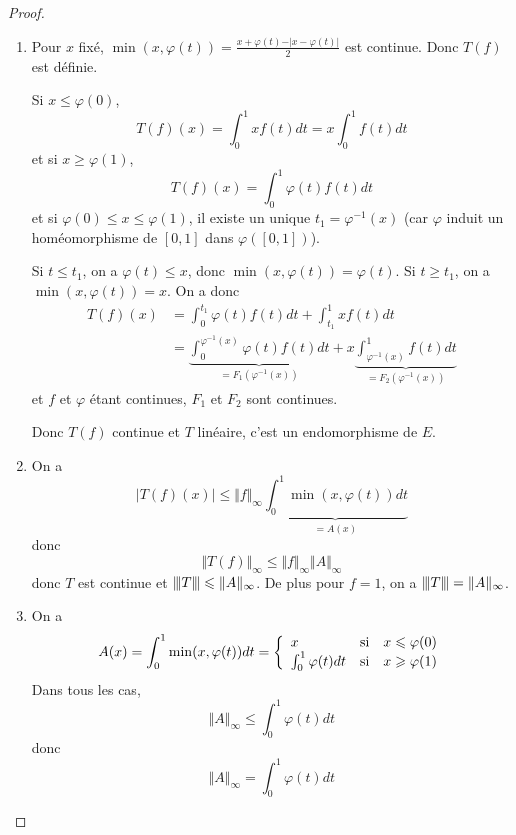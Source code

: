 \begin{proof}
	\phantom{}
	\begin{enumerate}
		\item Pour $x$ fixé, $\min(x,\varphi(t))=\frac{x+\varphi(t)-\vert x-\varphi(t)\vert}{2}$ est continue. Donc $T(f)$ est définie.
		
		Si $x\leqslant\varphi(0)$,
		\begin{equation}T(f)(x)=\int_{0}^{1}xf(t)dt=x\int_{0}^{1}f(t)dt\end{equation}
		et si $x\geqslant\varphi(1)$,
		\begin{equation}T(f)(x)=\int_{0}^{1}\varphi(t)f(t)dt\end{equation} 
		et si $\varphi(0)\leqslant x\leqslant\varphi(1)$, il existe un unique $t_{1}=\varphi^{-1}(x)$ (car $\varphi$ induit un homéomorphisme de $[0,1]$ dans $\varphi([0,1])$). 
		
		Si $t\leqslant t_{1}$, on a $\varphi(t)\leqslant x$, donc $\min(x,\varphi(t))=\varphi(t)$. Si $t\geqslant t_{1}$, on a $\min(x,\varphi(t))=x$. On a donc 
		\begin{align}
			T(f)(x)
			&=\int_{0}^{t_{1}}\varphi(t)f(t)dt+\int_{t_{1}}^{1}xf(t)dt\\
			&=\underbrace{\int_{0}^{\varphi^{-1}(x)}\varphi(t)f(t)dt}_{=F_{1}(\varphi^{-1}(x))}+x\underbrace{\int_{\varphi^{-1}(x)}^{1}f(t)dt}_{=F_{2}(\varphi^{-1}(x))}
		\end{align}
		et $f$ et $\varphi$ étant continues, $F_{1}$ et $F_{2}$ sont continues.

		Donc $T(f)$ continue et $T$ linéaire, c'est un endomorphisme de $E$.

		\item On a 
		\begin{equation*}
			\vert T(f)(x)\vert\leqslant\Vert f\Vert_{\infty}\underbrace{\int_{0}^{1}\min(x,\varphi(t))dt}_{=A(x)}
		\end{equation*}
		donc 
		\begin{equation}\Vert T(f)\Vert_{\infty}\leqslant\Vert f\Vert_{\infty}\Vert A\Vert_{\infty}\end{equation}
		donc $T$ est continue et ${\left\vert\kern-0.25ex\left\vert\kern-0.25ex\left\vert{}T \right\vert\kern-0.25ex\right\vert\kern-0.25ex\right\vert}\leqslant\Vert A\Vert_{\infty}$. De plus pour $f=1$, on a ${\left\vert\kern-0.25ex\left\vert\kern-0.25ex\left\vert{}T \right\vert\kern-0.25ex\right\vert\kern-0.25ex\right\vert}=\Vert A\Vert_{\infty}$.

		\item On a 
		\begin{equation}
		A(x)=\int_{0}^{1}\min(x,\varphi(t))dt=
		\left\{
			\begin{array}[]{lll}
				x & \text{si} & x\leqslant\varphi(0)\\
				\int_{0}^{1}\varphi(t)dt & \text{si} & x\geqslant\varphi(1)
			\end{array}
		\right.
		\end{equation}
		Dans tous les cas, 
		\begin{equation}\Vert A\Vert_{\infty}\leqslant\int_{0}^{1}\varphi(t)dt\end{equation}
		donc 
		\begin{equation}\Vert A\Vert_{\infty}=\int_{0}^{1}\varphi(t)dt\end{equation}
	\end{enumerate}
\end{proof}

